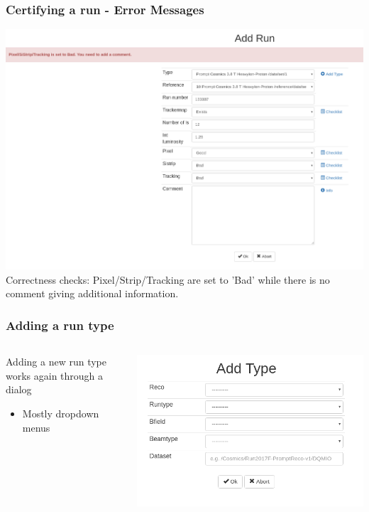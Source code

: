 \documentclass{beamer}
\begin{document}
\begin{frame}
\frametitle{Certifying a run - Error Messages}
\includegraphics[width=\textwidth]{figures/error.png}\\
Correctness checks: Pixel/Strip/Tracking are set to 'Bad' while there is no comment giving additional information.
\end{frame}


\begin{frame}
  \frametitle{Adding a run type}
  \begin{columns}[T]
    \begin{column}{.5\textwidth}
    \begin{block}{}

	Adding a new run type works again through a dialog
	\begin{itemize}
	\item Mostly dropdown menus
	\end{itemize}
   	\end{block}	
    \end{column}
    \begin{column}{.5\textwidth}
    \begin{block}{}
	\includegraphics[width=\textwidth]{figures/add_type.png}
    \end{block}
  \end{column}
\end{columns}
\end{frame}
\end{document}
